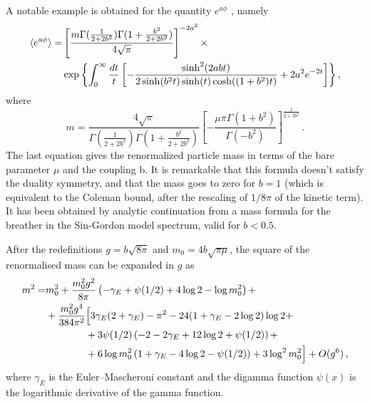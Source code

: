 \documentclass[12pt,a4paper]{report}
\begin{document}
   A notable example is obtained for the quantity $e^{a\phi}$ \cite{fateev1997expectation}, namely
\begin{align}
\braket{e^{a \phi}} =  &\left[ \dfrac{m\Gamma(\frac{1}{2+2b^2}) \Gamma(1+ \frac{b^2}{2+2b^2}) }{4 \sqrt{\pi}}  \right]^{-2 a^2} \times  \\ & \exp{\left\lbrace \int_0^\infty \dfrac{dt}{t} \left[ - \dfrac{\sinh^2(2 a b t)}{2 \sinh(b^2t) \sinh(t)\cosh((1+b^2)t) } + 2 a^2 e^{-2t} \right]  \right\rbrace } \nonumber \,,
\end{align} where \cite{zamolodchikov1995mass} \begin{equation}
\label{eq:mass_continuum}
m = \dfrac{4 \sqrt{\pi}}{\Gamma(\frac{1}{2+2b^2})\Gamma(1 +\frac{b^2}{2+2b^2}) } \left[ - \dfrac{\mu \pi \Gamma(1+b^2)}{\Gamma(-b^2)} \right]^{\frac{1}{2+2b^2}} \,.
\end{equation} The last equation gives the renormalized particle mass in terms of the bare parameter $\mu$ and the coupling b. It is remarkable that this formula doesn't satisfy the duality symmetry, and that the mass goes to zero for $b=1$ (which is equivalent to the Coleman bound, after the rescaling of $1/8\pi$ of the kinetic term). It has been obtained by analytic continuation from a mass formula for the breather in the Sin-Gordon model spectrum, valid for $b<0.5$.

After the redefinitions $g=b\sqrt{8\pi}$ and $m_0=4b\sqrt{\pi\mu}$, the square of the renormalised mass can be expanded in $g$ as
\begin{align}
\label{eq:exactrenormalisedmassexpansion}
m^2=&m_0^2+\frac{m_0^2g^2}{8\pi}\left(
-\gamma_E+\psi(1/2) +4 \log 2-\log m_0^2
\right)+\notag\\
&+\frac{m_0^2g^4}{384\pi^2}\Big[
3\gamma_E(2+\gamma_E)-\pi^2-24(1+\gamma_E-2\log 2)\log 2+\notag\\
&\qquad\qquad+3\psi(1/2)\left(-2-2\gamma_E+12\log 2+\psi(1/2)\right)+\notag\\
&\qquad\qquad+6\log m_0^2\left(1+\gamma_E-4\log 2-\psi(1/2)\right)+3\log^2m_0^2
\Big]+O(g^6)\,,
\end{align}
where $\gamma_E$ is the Euler–Mascheroni constant and the digamma function $\psi(x)$ is the logarithmic derivative of the gamma function.
\end{document}
